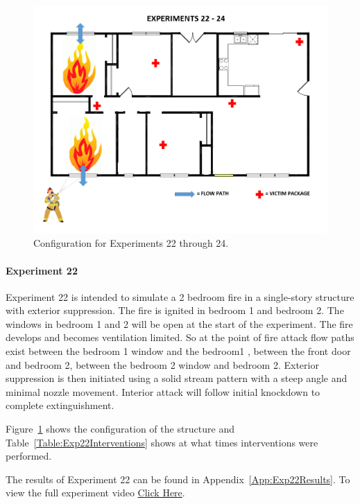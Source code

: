 \documentclass[12pt,oneside]{book}
\begin{document}
\begin{figure}[H]
	\centering
	\includegraphics[width=5in]{Figures/General/Exps22through24.png}
	\caption{Configuration for Experiments 22 through 24.}
	\label{fig:ExpConfig22to24}
\end{figure}

\clearpage

\paragraph{Experiment 22} \mbox{}

Experiment 22 is intended to simulate a 2 bedroom fire in a single-story structure with exterior suppression. The fire is ignited in bedroom 1 and bedroom 2. The windows in bedroom 1 and 2 will be open at the start of the experiment. The fire develops and becomes ventilation limited. So at the point of fire attack flow paths exist between the bedroom 1 window and the bedroom1 , between the front door and bedroom 2, between the bedroom 2 window and bedroom 2. Exterior suppression is then initiated using a solid stream pattern with a steep angle and minimal nozzle movement. Interior attack will follow initial knockdown to complete extinguishment. 

Figure~\ref{fig:ExpConfig22to24} shows the configuration of the structure and Table~\ref{Table:Exp22Interventions} shows at what times interventions were performed. 

The results of Experiment 22 can be found in Appendix~\ref{App:Exp22Results}. To view the full experiment video \href{https://youtu.be/gl8rc1Nsl1k}{Click Here}.
\end{document}
